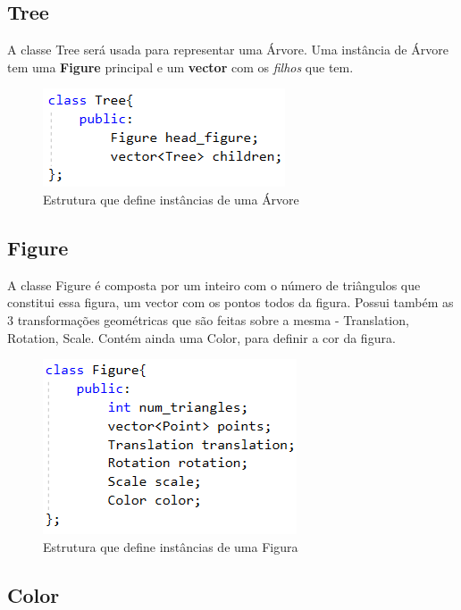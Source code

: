 \documentclass[a4paper]{article}
\begin{document}
\subsection{Tree}
\label{sec:tree}

A classe Tree será usada para representar uma Árvore. Uma instância de Árvore tem uma \textbf{Figure} principal e um \textbf{vector} com os \textit{filhos} que tem.

\begin{figure}[H]
\centering
\includegraphics[scale=0.8]{tree.png}
\caption{Estrutura que define instâncias de uma Árvore}
\label{img:Tree}
\end{figure}


\subsection{Figure}
\label{sec:figure}

A classe Figure é composta por um inteiro com o número de triângulos que constitui essa figura, um vector com os pontos todos da figura. Possui também as 3 transformações geométricas que são feitas sobre a mesma - Translation, Rotation, Scale. Contém ainda uma Color, para definir a cor da figura.

\begin{figure}[H]
\centering
\includegraphics[scale=0.8]{figure.png}
\caption{Estrutura que define instâncias de uma Figura}
\label{img:Figure}
\end{figure}


\subsection{Color}
\label{sec:color}
\end{document}
